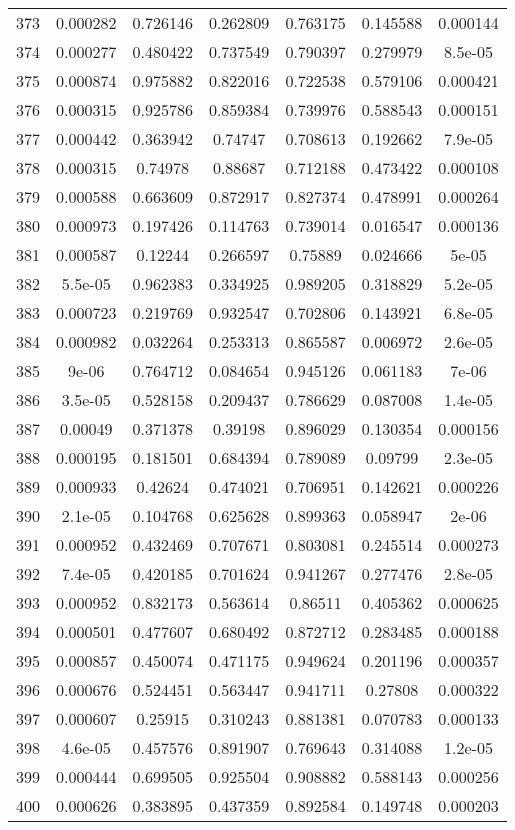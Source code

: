 \begin{table}
\begin{tabular}{c|c|c|c|c|c|c}
373 & 0.000282 & 0.726146 & 0.262809 & 0.763175 & 0.145588 & 0.000144\\
374 & 0.000277 & 0.480422 & 0.737549 & 0.790397 & 0.279979 & 8.5e-05\\
375 & 0.000874 & 0.975882 & 0.822016 & 0.722538 & 0.579106 & 0.000421\\
376 & 0.000315 & 0.925786 & 0.859384 & 0.739976 & 0.588543 & 0.000151\\
377 & 0.000442 & 0.363942 & 0.74747 & 0.708613 & 0.192662 & 7.9e-05\\
378 & 0.000315 & 0.74978 & 0.88687 & 0.712188 & 0.473422 & 0.000108\\
379 & 0.000588 & 0.663609 & 0.872917 & 0.827374 & 0.478991 & 0.000264\\
380 & 0.000973 & 0.197426 & 0.114763 & 0.739014 & 0.016547 & 0.000136\\
381 & 0.000587 & 0.12244 & 0.266597 & 0.75889 & 0.024666 & 5e-05\\
382 & 5.5e-05 & 0.962383 & 0.334925 & 0.989205 & 0.318829 & 5.2e-05\\
383 & 0.000723 & 0.219769 & 0.932547 & 0.702806 & 0.143921 & 6.8e-05\\
384 & 0.000982 & 0.032264 & 0.253313 & 0.865587 & 0.006972 & 2.6e-05\\
385 & 9e-06 & 0.764712 & 0.084654 & 0.945126 & 0.061183 & 7e-06\\
386 & 3.5e-05 & 0.528158 & 0.209437 & 0.786629 & 0.087008 & 1.4e-05\\
387 & 0.00049 & 0.371378 & 0.39198 & 0.896029 & 0.130354 & 0.000156\\
388 & 0.000195 & 0.181501 & 0.684394 & 0.789089 & 0.09799 & 2.3e-05\\
389 & 0.000933 & 0.42624 & 0.474021 & 0.706951 & 0.142621 & 0.000226\\
390 & 2.1e-05 & 0.104768 & 0.625628 & 0.899363 & 0.058947 & 2e-06\\
391 & 0.000952 & 0.432469 & 0.707671 & 0.803081 & 0.245514 & 0.000273\\
392 & 7.4e-05 & 0.420185 & 0.701624 & 0.941267 & 0.277476 & 2.8e-05\\
393 & 0.000952 & 0.832173 & 0.563614 & 0.86511 & 0.405362 & 0.000625\\
394 & 0.000501 & 0.477607 & 0.680492 & 0.872712 & 0.283485 & 0.000188\\
395 & 0.000857 & 0.450074 & 0.471175 & 0.949624 & 0.201196 & 0.000357\\
396 & 0.000676 & 0.524451 & 0.563447 & 0.941711 & 0.27808 & 0.000322\\
397 & 0.000607 & 0.25915 & 0.310243 & 0.881381 & 0.070783 & 0.000133\\
398 & 4.6e-05 & 0.457576 & 0.891907 & 0.769643 & 0.314088 & 1.2e-05\\
399 & 0.000444 & 0.699505 & 0.925504 & 0.908882 & 0.588143 & 0.000256\\
400 & 0.000626 & 0.383895 & 0.437359 & 0.892584 & 0.149748 & 0.000203\\
\end{tabular}
\end{table}
